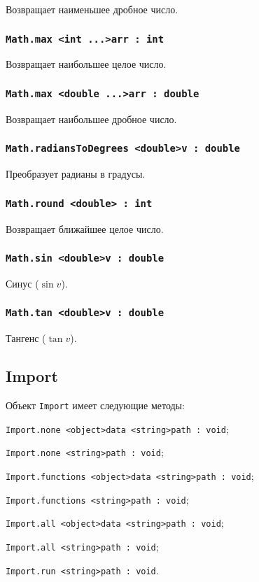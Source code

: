 Возвращает наименьшее дробное число.

\subsubsection{\lstinline|Math.max <int ...>arr : int|}

Возвращает наибольшее целое число.

\subsubsection{\lstinline|Math.max <double ...>arr : double|}

Возвращает наибольшее дробное число.

\subsubsection{\lstinline|Math.radiansToDegrees <double>v : double|}

Преобразует радианы в градусы.

\subsubsection{\lstinline|Math.round <double> : int|}

Возвращает ближайшее целое число.

\subsubsection{\lstinline|Math.sin <double>v : double|}

Синус ($\sin{v}$).

\subsubsection{\lstinline|Math.tan <double>v : double|}

Тангенс ($\tan{v}$).

\subsection{{\color{orange} Import}}

Объект \lstinline|Import| имеет следующие методы:
\begin{icItems}
	\item \lstinline|Import.none <object>data <string>path : void|;
	\item \lstinline|Import.none <string>path : void|;
	\item \lstinline|Import.functions <object>data <string>path : void|;
	\item \lstinline|Import.functions <string>path : void|;
	\item \lstinline|Import.all <object>data <string>path : void|;
	\item \lstinline|Import.all <string>path : void|;
	\item \lstinline|Import.run <string>path : void|.
\end{icItems}

